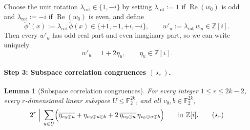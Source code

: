 \documentclass[11pt,a4paper]{article}
\theoremstyle{plain}
\newtheorem{lemma}{Lemma}[section]
\theoremstyle{definition}
\theoremstyle{remark}
\newcommand{\F}{\mathbb{F}}
\newcommand{\Zi}{\mathbb{Z}[i]}
\newcommand{\RePart}{\operatorname{Re}}
\numberwithin{equation}{section}
\begin{document}
Choose the unit rotation $\lambda_{\mathrm{rot}} \in \{1, -i\}$ by setting $\lambda_{\mathrm{rot}} := 1$ if $\RePart(w_0)$ is odd and $\lambda_{\mathrm{rot}} := -i$ if $\RePart(w_0)$ is even, and define
\[
  \tilde{\phi}'(x) := \lambda_{\mathrm{rot}}\,\tilde{\phi}(x) \in \{+1, -1, +i, -i\},
  \qquad
  w'_u := \lambda_{\mathrm{rot}}\,w_u \in \Zi.
\]
Then every $w'_u$ has odd real part and even imaginary part, so we can write uniquely
\begin{equation}\label{eq:wprime-eta}
  w'_u = 1 + 2\eta_u, \qquad \eta_u \in \Zi.
\end{equation}

\paragraph{Step 3: Subspace correlation congruences $(\star_r)$.}
\begin{lemma}[Subspace correlation congruences]\label{lem:corr-congr}
For every integer $1 \le r \le 2k - 2$, every $r$-dimensional linear subspace $U \le \F_2^{2k}$, and all $v_0, b \in \F_2^{2k}$,
\begin{equation*}
  2^r \;\Big|\; \sum_{u \in U} \Bigl(\overline{\eta_{v_0 \oplus u}} + \eta_{v_0 \oplus u \oplus b} + 2\,\overline{\eta_{v_0 \oplus u}}\,\eta_{v_0 \oplus u \oplus b}\Bigr)
  \qquad \text{in } \Zi. \tag{$\star_r$}\label{eq:corr-congr}
\end{equation*}
\end{lemma}
\end{document}
